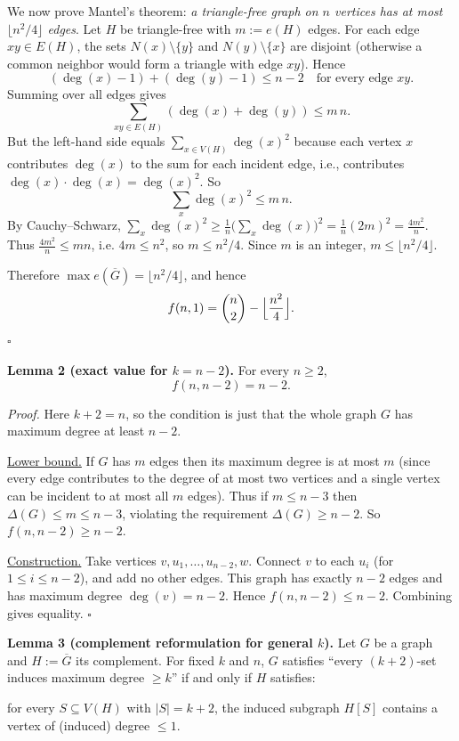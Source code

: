 We now prove Mantel's theorem:
\emph{a triangle-free graph on $n$ vertices has at most $\lfloor n^2/4\rfloor$
edges}.
Let $H$ be triangle-free with $m:=e(H)$ edges. For each edge $xy\in E(H)$, the sets
$N(x)\setminus\{y\}$ and $N(y)\setminus\{x\}$ are disjoint (otherwise a common
neighbor would form a triangle with edge $xy$).
Hence
\[
(\deg(x)-1)+(\deg(y)-1) \le n-2\quad\text{for every edge }xy.
\]
Summing over all edges gives
\[
\sum_{xy\in E(H)} (\deg(x)+\deg(y)) \le m\,n.
\]
But the left-hand side equals $\sum_{x\in V(H)} \deg(x)^2$ because each vertex $x$
contributes $\deg(x)$ to the sum for each incident edge, i.e., contributes
$\deg(x)\cdot \deg(x)=\deg(x)^2$.
So
\[
\sum_{x} \deg(x)^2 \le m\,n.
\]
By Cauchy--Schwarz,
$\sum_x \deg(x)^2 \ge \frac{1}{n}\bigl(\sum_x \deg(x)\bigr)^2
=\frac{1}{n}(2m)^2=\frac{4m^2}{n}$.
Thus $\frac{4m^2}{n}\le mn$, i.e. $4m\le n^2$, so $m\le n^2/4$.
Since $m$ is an integer, $m\le \lfloor n^2/4\rfloor$.

Therefore $\max e(\overline{G}) = \lfloor n^2/4\rfloor$, and hence
\[
 f(n,1)=\binom{n}{2}-\Bigl\lfloor\frac{n^2}{4}\Bigr\rfloor.
\]
\hfill $\square$

\medskip
\textbf{Lemma 2 (exact value for $k=n-2$).}
For every $n\ge2$,
\[
 f(n,n-2)=n-2.
\]

\emph{Proof.}
Here $k+2=n$, so the condition is just that the whole graph $G$ has
maximum degree at least $n-2$.

\underline{Lower bound.}
If $G$ has $m$ edges then its maximum degree is at most $m$ (since every edge
contributes to the degree of at most two vertices and a single vertex can be
incident to at most all $m$ edges). Thus if $m\le n-3$ then
$\Delta(G)\le m\le n-3$, violating the requirement $\Delta(G)\ge n-2$.
So $f(n,n-2)\ge n-2$.

\underline{Construction.}
Take vertices $v,u_1,\dots,u_{n-2},w$.
Connect $v$ to each $u_i$ (for $1\le i\le n-2$), and add no other edges.
This graph has exactly $n-2$ edges and has maximum degree $\deg(v)=n-2$.
Hence $f(n,n-2)\le n-2$.
Combining gives equality.
\hfill $\square$

\medskip
\textbf{Lemma 3 (complement reformulation for general $k$).}
Let $G$ be a graph and $H:=\overline{G}$ its complement.
For fixed $k$ and $n$, $G$ satisfies
``every $(k+2)$-set induces maximum degree $\ge k$''
if and only if $H$ satisfies:

\medskip
\noindent for every $S\subseteq V(H)$ with $|S|=k+2$, the induced subgraph $H[S]$
contains a vertex of (induced) degree $\le 1$.

